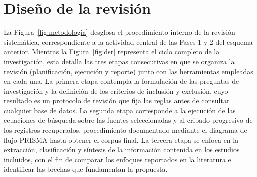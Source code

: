 \section{Diseño de la revisión}

La Figura~\ref{fig:metodologia} desglosa el procedimiento interno de la revisión sistemática, correspondiente a la actividad central de las Fases 1 y 2 del esquema anterior. Mientras la Figura~\ref{fig:dsr} representa el ciclo completo de la investigación, esta detalla las tres etapas consecutivas en que se organiza la revisión (planificación, ejecución y reporte) junto con las herramientas empleadas en cada una. La primera etapa contempla la formulación de las preguntas de investigación y la definición de los criterios de inclusión y exclusión, cuyo resultado es un protocolo de revisión que fija las reglas antes de consultar cualquier base de datos. La segunda etapa corresponde a la ejecución de las ecuaciones de búsqueda sobre las fuentes seleccionadas y al cribado progresivo de los registros recuperados, procedimiento documentado mediante el diagrama de flujo PRISMA hasta obtener el corpus final. La tercera etapa se enfoca en la extracción, clasificación y síntesis de la información contenida en los estudios incluidos, con el fin de comparar los enfoques reportados en la literatura e identificar las brechas que fundamentan la propuesta.

